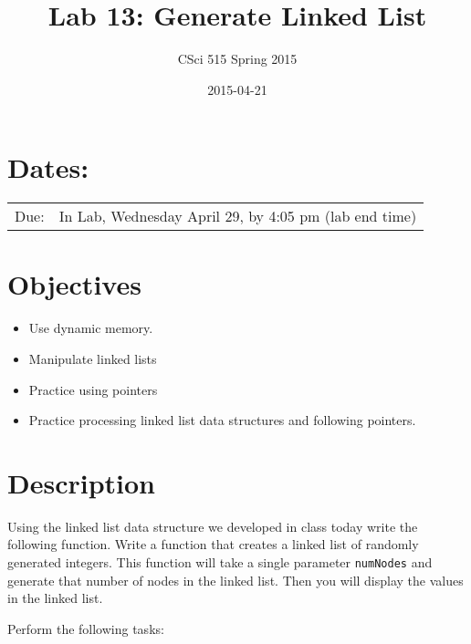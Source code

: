 \documentclass[11pt]{article}
\title{Lab 13: Generate Linked List}
\author{CSci 515 Spring 2015}
\date{2015-04-21}
\begin{document}
\maketitle


\section*{Dates:}
\label{sec-1}


\begin{center}
\begin{tabular}{ll}
 Due:  &  In Lab, Wednesday April 29, by 4:05 pm (lab end time)  \\
\end{tabular}
\end{center}
\section*{Objectives}
\label{sec-2}

\begin{itemize}
\item Use dynamic memory.
\item Manipulate linked lists
\item Practice using pointers
\item Practice processing linked list data structures and following pointers.
\end{itemize}
\section*{Description}
\label{sec-3}

Using the linked list data structure we developed in class today write
the following function.  Write a function that creates
a linked list of randomly generated integers.  This function
will take a single parameter \verb~numNodes~ and generate that number of nodes
in the linked list.  Then you will display the values in the linked
list.

Perform the following tasks:
\end{document}
